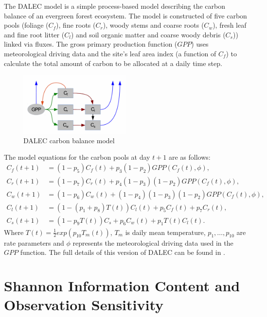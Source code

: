 \documentclass[11pt]{article}
\begin{document}
The DALEC model is a simple process-based model describing the carbon balance of an evergreen forest ecosystem. The model is constructed of five carbon pools (foliage ($C_f$), fine roots ($C_r$), woody stems and coarse roots ($C_w$), fresh leaf and fine root litter ($C_l$) and soil organic matter and coarse woody debris ($C_s$)) linked via fluxes. The gross primary production function ($GPP$) uses meteorological driving data and the site's leaf area index (a function of $C_f$) to calculate the total amount of carbon to be allocated at a daily time step.   
\begin{figure}[h!]
    \centering
    \includegraphics[width=0.5\textwidth]{DALECpic.png}
    \caption{DALEC carbon balance model \cite{delahaies2013regularization}}
    \label{fig:DALEC_mod}
\end{figure}
The model equations for the carbon pools at day $t+1$ are as follows:
\begin{align*}
C_f(t+1)&=(1-p_5)C_f(t)+p_3(1-p_2)GPP(C_f(t),\phi),
\\C_r(t+1)&=(1-p_7)C_r(t)+p_4(1-p_3)(1-p_2)GPP(C_f(t),\phi), 
\\C_w(t+1)&=(1-p_6)C_w(t)+(1-p_4)(1-p_3)(1-p_2)GPP(C_f(t),\phi), 
\\C_l(t+1)&=(1-(p_1+p_8)T(t))C_l(t)+p_5C_f(t)+p_7C_r(t), 
\\C_s(t+1)&=(1-p_9T(t))C_s+p_6C_w(t)+p_1T(t)C_l(t).
\end{align*}
Where $T(t)=\frac{1}{2}exp(p_{10}T_m(t))$, $T_m$ is daily mean temperature, $p_1,\ldots,p_{10}$ are rate parameters and $\phi$ represents the meteorological driving data used in the $GPP$ function. The full details of this version of DALEC can be found in \cite{williams2005improved}.

\section*{Shannon Information Content and Observation Sensitivity}
\end{document}
